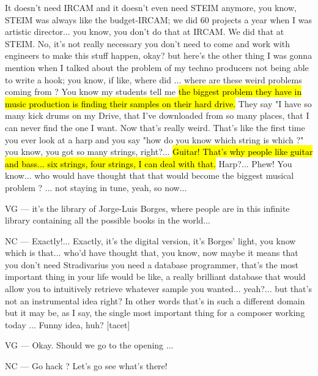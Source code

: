 It doesn't need IRCAM and it doesn't even need STEIM anymore, you know, STEIM was always like the budget-IRCAM; we did 60 projects a year when I was artistic director... you know, you don't do that at IRCAM. We did that at STEIM. No, it's not really necessary you don't need to come and work with engineers to make this stuff happen, okay? but here's the other thing I was gonna mention when I talked about the problem of my techno producers not being able to write a hook; you know, if like, where did ... where are these weird problems coming from ? You know my students tell me \hl{the biggest problem they have in music production is finding their samples on their hard drive.} They say "I have so many kick drums on my Drive, that I've downloaded from so many places, that I can never find the one I want. Now that's really weird. That's like the first time you ever look at a harp and you say "how do you know which string is which ?" you know, you got so many strings, right?... \hl{Guitar! That's why people like guitar and bass... six strings, four strings, I can deal with that.} Harp?... Phew! You know... who would have thought that that would become the biggest musical problem ? ... not staying in tune, yeah, so now... 

VG — it's the library of Jorge-Luis Borges,  where people are in this infinite library containing all the possible  books in the world... 

NC — Exactly!... Exactly, it's the digital version, it's Borges' light, you know which is that... who'd have thought that, you know,  now maybe it means that you don't need Stradivarius you need a database programmer, that's the most important thing in your life would be like, a really brilliant database that would allow you to intuitively retrieve whatever sample you wanted... yeah?... but that's not an instrumental  idea right? In other words that's in such a different domain but it may be, as I say, the single most important thing for a composer working today ... Funny idea, huh? [tacet] 

VG — Okay. Should we go to the opening ... 

NC — Go hack ? Let's go see what's there! 
